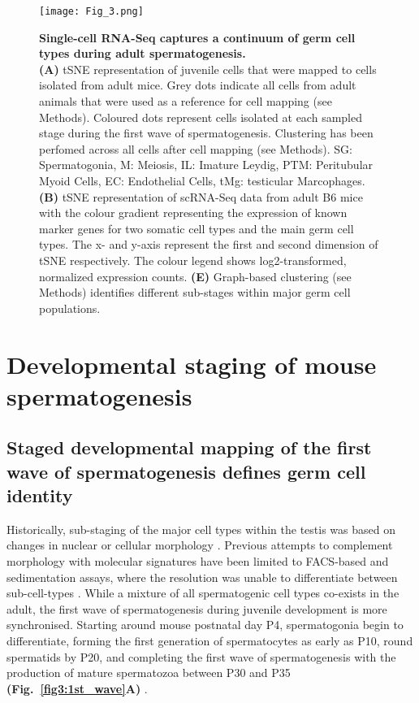 \begin{figure}[!h]
\centering
\texttt{[image: Fig\_3.png]}
\caption[Droplet based scRNAseq of mouse spermatogenesis]{\textbf{Single-cell RNA-Seq captures a continuum of germ cell types during adult spermatogenesis.}\\
\textbf{(A)} tSNE representation of juvenile cells that were mapped to cells isolated from adult mice. Grey dots indicate all cells from adult animals that were used as a reference for cell mapping (see Methods). Coloured dots represent cells isolated at each sampled stage during the first wave of spermatogenesis. Clustering has been perfomed across all cells after cell mapping (see Methods). SG: Spermatogonia, M: Meiosis, IL: Imature Leydig, PTM: Peritubular Myoid Cells, EC: Endothelial Cells, tMg: testicular Marcophages. \textbf{(B)} tSNE representation of scRNA-Seq data from adult B6 mice with the colour gradient representing the expression of known marker genes for two somatic cell types and the main germ cell types. The x- and y-axis represent the first and second dimension of tSNE respectively. The colour legend shows log2-transformed, normalized expression counts. \textbf{(E)} Graph-based clustering (see Methods) identifies different sub-stages within major germ cell populations. 
}
\label{fig3:cell_types}
\end{figure}

\section{Developmental staging of mouse spermatogenesis}
\subsection*{Staged developmental mapping of the first wave of spermatogenesis defines germ cell identity}

Historically, sub-staging of the major cell types within the testis was based on changes in nuclear or cellular morphology \citep{Oakberg1956,  Oakberg1956a}. Previous attempts to complement morphology with molecular signatures have been limited to FACS-based and sedimentation assays, where the resolution was unable to differentiate between sub-cell-types \citep{Bastos2005, Gaysinskaya2014, Lam1970, Meistrich1977, Romrell1976, Soumillon2013}. While a mixture of all spermatogenic cell types co-exists in the adult, the first wave of spermatogenesis during juvenile development is more synchronised. Starting around mouse postnatal day P4, spermatogonia begin to differentiate, forming the first generation of spermatocytes as early as P10, round spermatids by P20, and completing the first wave of spermatogenesis with the production of mature spermatozoa between P30 and P35 \textbf{(Fig.~\ref{fig3:1st_wave}A)} \citep{Bellve1977, Janca1986, Nebel1961}.\\
 
